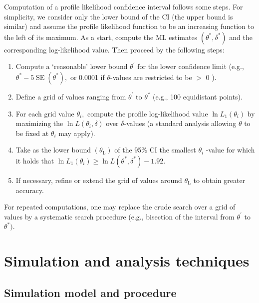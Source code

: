 \documentclass[12pt,oneside,a4paper]{reedthesis}
\begin{document}
Computation of a profile likelihood confidence interval follows some steps. For simplicity, we consider only the lower bound of the CI (the upper bound is similar) and assume the profile likelihood function to be an increasing function to the left of its maximum. As a start, compute the ML estimates \(\left(\theta^*, \delta^{*}\right)\) and the corresponding log-likelihood value. Then proceed by the following steps:
\begin{enumerate}
\def\labelenumi{\arabic{enumi}.}
\item
  Compute a `reasonable' lower bound \(\theta^{\prime}\) for the lower confidence limit (e.g., \(\theta^{*}-5 \operatorname{SE}\left(\theta^{*}\right),\) or 0.0001 if \(\theta\)-values are restricted to be \(>\) 0 ).
\item
  Define a grid of values ranging from \(\theta^{\prime}\) to \(\theta^{*}\) (e.g., 100 equidistant points).
\item
  For each grid value \(\theta_{i},\) compute the profile log-likelihood value \(\ln L_{1}\left(\theta_{i}\right)\) by maximizing the \(\ln L\left(\theta_{i}, \delta\right)\) over \(\delta\)-values (a standard analysis allowing \(\theta\) to be fixed at \(\theta_{i}\) may apply).
\item
  Take as the lower bound \(\left(\theta_{\mathrm{L}}\right)\) of the 95\(\%\) CI the smallest \(\theta_{i}\) -value for which it holds that \(\ln L_{1}\left(\theta_{i}\right) \geq \ln L\left(\theta^{*}, \delta^{*}\right)-1.92\).
\item
  If necessary, refine or extend the grid of values around \(\theta_{\mathrm{L}}\) to obtain greater accuracy.
\end{enumerate}
For repeated computations, one may replace the crude search over a grid of values by a systematic search procedure (e.g., bisection of the interval from \(\theta^{\prime}\) to \(\theta^{*} )\).

\hypertarget{simulation}{%
\chapter{Simulation and analysis techniques}\label{simulation}}

\hypertarget{simulation-model-and-procedure}{%
\section{Simulation model and procedure}\label{simulation-model-and-procedure}}
\end{document}
